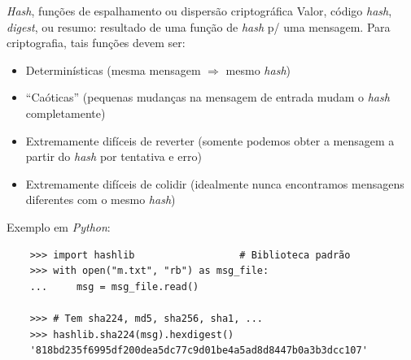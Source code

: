 \documentclass[utf8]{beamer}
\begin{document}
\begin{frame}[fragile]{\emph{Hash},
              funções de espalhamento ou dispersão criptográfica}
  Valor, código \emph{hash}, \emph{digest}, ou resumo:
  resultado de uma função de \emph{hash} p/ uma mensagem.
  Para criptografia, tais funções devem ser:
  \begin{itemize}
    \item Determinísticas
          (mesma mensagem $\Rightarrow$ mesmo \emph{hash})
    \item ``Caóticas'' (pequenas mudanças na mensagem de entrada
                        mudam o \emph{hash} completamente)
    \item Extremamente difíceis de reverter
          (somente podemos obter a mensagem a partir do \emph{hash}
           por tentativa e erro)
    \item Extremamente difíceis de colidir
          (idealmente nunca encontramos
           mensagens diferentes com o mesmo \emph{hash})
  \end{itemize}
  \vspace{.5em}
  \vfill
  Exemplo em \emph{Python}:
  \vspace{-.5em}
  \begin{verbatim}
    >>> import hashlib                  # Biblioteca padrão
    >>> with open("m.txt", "rb") as msg_file:
    ...     msg = msg_file.read()

    >>> # Tem sha224, md5, sha256, sha1, ...
    >>> hashlib.sha224(msg).hexdigest()
    '818bd235f6995df200dea5dc77c9d01be4a5ad8d8447b0a3b3dcc107'
  \end{verbatim}
\end{frame}
\end{document}
